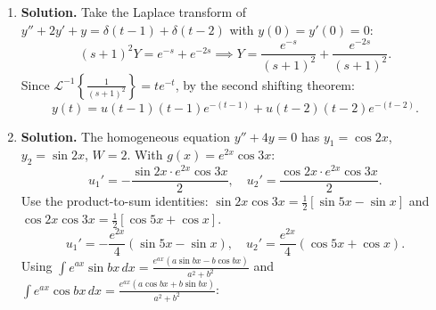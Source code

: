 \begin{enumerate}
$2=(As+B)(s^2-2s+5)+(Cs+D)(s^2+1)$.

Set $s=i$: $2=(Ai+B)(4-2i)+(Ci+D)(0)=(Ai+B)(4-2i)$.

$(Ai+B)(4-2i)=4Ai-2Ai^2+4B-2Bi=2A+4B+(4A-2B)i=2$.

So $4A-2B=0$ and $2A+4B=2$. From the first: $A=B/2$. Then $B+4B=2$, $B=\frac{2}{5}$, $A=\frac{1}{5}$.

Set $s=1+2i$. Since $s^2-2s+5=(s-1)^2+4$, at $s=1+2i$ we get $(2i)^2+4=0$. Evaluating $s^2+1$ at $s=1+2i$: $(1+2i)^2+1=1+4i-4+1=-2+4i$.

$2=(C(1+2i)+D)(-2+4i)$.

$C(1+2i)+D = (C+D)+2Ci$. Multiply by $(-2+4i)$: $(-2(C+D)-4C\cdot 2)+ (4(C+D)-2\cdot 2C)i = (-2C-2D-8C)+ (4C+4D-4C)i = (-10C-2D)+4Di$.

So $-10C-2D=2$ and $4D=0$, giving $D=0$ and $C=-\frac{1}{5}$.

\[
Y = \frac{1}{5}\cdot\frac{s+2}{s^2+1}-\frac{1}{5}\cdot\frac{s}{s^2-2s+5}=\frac{1}{5}\cdot\frac{s}{s^2+1}+\frac{2}{5}\cdot\frac{1}{s^2+1}-\frac{1}{5}\cdot\frac{(s-1)+1}{(s-1)^2+4}.
\]
\[
= \frac{1}{5}\cdot\frac{s}{s^2+1}+\frac{2}{5}\cdot\frac{1}{s^2+1}-\frac{1}{5}\cdot\frac{s-1}{(s-1)^2+4}-\frac{1}{10}\cdot\frac{2}{(s-1)^2+4}.
\]
Inverse:
\[
\boxed{y(t) = \frac{1}{5}\cos t+\frac{2}{5}\sin t-\frac{1}{5}e^t\cos 2t-\frac{1}{10}e^t\sin 2t}.
\]

\item \textbf{Solution.}
Take the Laplace transform of $y''+2y'+y=\delta(t-1)+\delta(t-2)$ with $y(0)=y'(0)=0$:
\[
(s+1)^2 Y = e^{-s}+e^{-2s} \implies Y = \frac{e^{-s}}{(s+1)^2}+\frac{e^{-2s}}{(s+1)^2}.
\]
Since $\mathcal{L}^{-1}\!\left\{\frac{1}{(s+1)^2}\right\}=te^{-t}$, by the second shifting theorem:
\[
\boxed{y(t) = u(t-1)(t-1)e^{-(t-1)}+u(t-2)(t-2)e^{-(t-2)}}.
\]

\item \textbf{Solution.}
The homogeneous equation $y''+4y=0$ has $y_1=\cos 2x$, $y_2=\sin 2x$, $W=2$. With $g(x)=e^{2x}\cos 3x$:
\[
u_1' = -\frac{\sin 2x\cdot e^{2x}\cos 3x}{2}, \quad u_2' = \frac{\cos 2x\cdot e^{2x}\cos 3x}{2}.
\]
Use the product-to-sum identities: $\sin 2x\cos 3x = \frac{1}{2}[\sin 5x-\sin x]$ and $\cos 2x\cos 3x = \frac{1}{2}[\cos 5x+\cos x]$.
\[
u_1' = -\frac{e^{2x}}{4}(\sin 5x-\sin x), \quad u_2' = \frac{e^{2x}}{4}(\cos 5x+\cos x).
\]
Using $\int e^{ax}\sin bx\,dx = \frac{e^{ax}(a\sin bx-b\cos bx)}{a^2+b^2}$ and $\int e^{ax}\cos bx\,dx = \frac{e^{ax}(a\cos bx+b\sin bx)}{a^2+b^2}$:


\end{enumerate}
